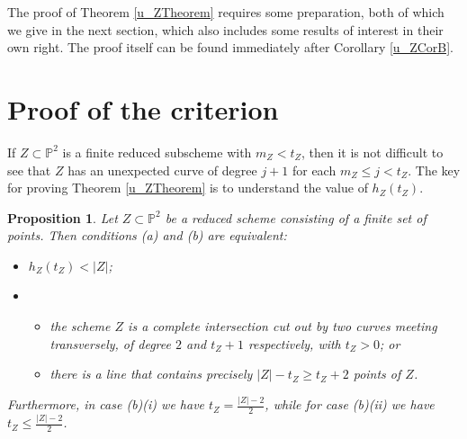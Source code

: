 \documentclass[12pt]{amsart}
\numberwithin{equation}{section}
\newtheorem{proposition}[theorem]{Proposition}
\theoremstyle{definition}
\begin{document}
The proof of Theorem \ref{u_ZTheorem} requires some preparation, both of which we give in the next section,
which also includes some results of interest in their own right.  The proof itself can be found immediately after  Corollary \ref{u_ZCorB}.

\section{Proof of the criterion}
   \label{sec:proof criterion}

If $Z\subset { \ensuremath{\mathbb{P}}}^2$ is a finite reduced subscheme with $m_Z<t_Z$, 
then it is not difficult to see that $Z$ has an unexpected curve of degree $j+1$ for each $m_Z\leq j<t_Z$.
The key for proving Theorem \ref{u_ZTheorem}
is to understand the value of $h_Z(t_Z)$.

\begin{proposition}\label{prop:small tZ}
Let $Z \subset { \ensuremath{\mathbb{P}}}^2$ be a reduced scheme consisting of a finite set of points.
Then conditions (a) and (b) are equivalent: 
\begin{itemize}
	\item[(a)] $h_Z (t_Z) < |Z|$; 
	\item[(b)] 
\begin{itemize}
	\item[(i)] the scheme $Z$ is a complete intersection cut out by two curves
meeting transversely, of degree $2$ and $t_Z + 1$ respectively, with $t_Z>0$;  or 
	\item[(ii)] there is a line that contains precisely  $|Z| - t_Z \ge t_Z + 2$ points of $Z$. 
\end{itemize}
\end{itemize}
Furthermore, in case (b)(i) we have $t_Z  = \frac{|Z| -2}{2}$,
while for case (b)(ii) we have $t_Z \le \frac{|Z| -2}{2}$.
\end{proposition} 
\end{document}
